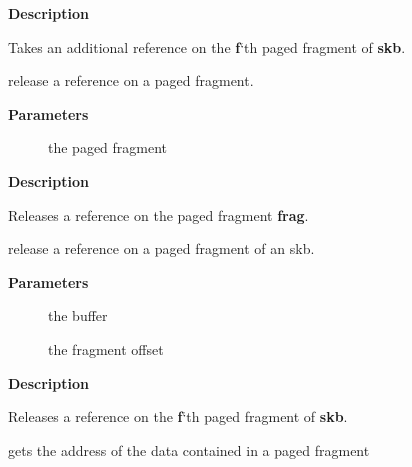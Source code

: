 \documentclass[a4paper,8pt,english]{sphinxmanual}
\begin{document}
\textbf{Description}

Takes an additional reference on the \textbf{f}`th paged fragment of \textbf{skb}.

\begin{fulllineitems}
\label{networking/kapi:c.__skb_frag_unref}
release a reference on a paged fragment.

\end{fulllineitems}


\textbf{Parameters}
\begin{description}
\item[{}] \leavevmode
the paged fragment

\end{description}

\textbf{Description}

Releases a reference on the paged fragment \textbf{frag}.

\begin{fulllineitems}
\label{networking/kapi:c.skb_frag_unref}
release a reference on a paged fragment of an skb.

\end{fulllineitems}


\textbf{Parameters}
\begin{description}
\item[{}] \leavevmode
the buffer

\item[{}] \leavevmode
the fragment offset

\end{description}

\textbf{Description}

Releases a reference on the \textbf{f}`th paged fragment of \textbf{skb}.

\begin{fulllineitems}
\label{networking/kapi:c.skb_frag_address}
gets the address of the data contained in a paged fragment

\end{fulllineitems}
\end{document}
